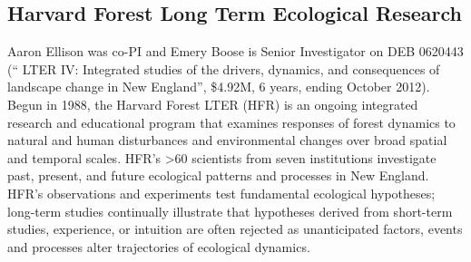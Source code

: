 \documentclass[10pt]{article}
\begin{document}
\subsection{Harvard Forest Long Term Ecological Research}

Aaron Ellison was co-PI and Emery Boose is Senior Investigator on DEB
0620443 (`` LTER IV: Integrated studies of the drivers, dynamics, and
consequences of landscape change in New England'', \$4.92M, 6 years,
ending October 2012). Begun in 1988, the Harvard Forest LTER (HFR) is
an ongoing integrated research and educational program that examines
responses of forest dynamics to natural and human disturbances and
environmental changes over broad spatial and temporal
scales. HFR’s >60 scientists from seven institutions
investigate past, present, and future ecological patterns and
processes in New England. HFR’s observations and experiments
test fundamental ecological hypotheses; long-term studies continually
illustrate that hypotheses derived from short-term studies,
experience, or intuition are often rejected as unanticipated factors,
events and processes alter trajectories of ecological dynamics.
\end{document}

